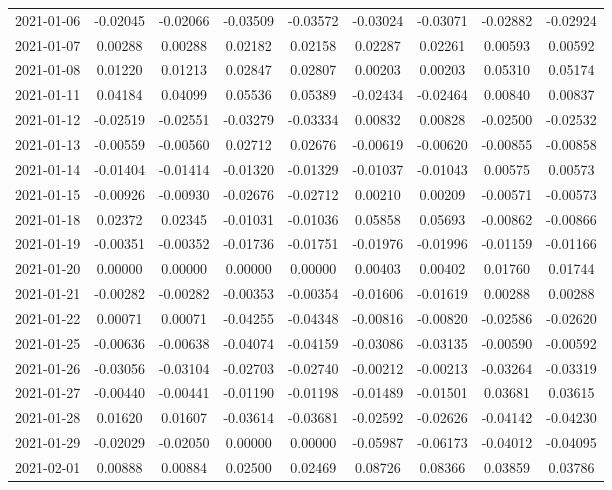 \begin{footnotesize}
\begin{longtable}{lcccccccc}
2021-01-06 & -0.02045 & -0.02066 & -0.03509 & -0.03572 & -0.03024 & -0.03071 & -0.02882 & -0.02924 \\
2021-01-07 & 0.00288 & 0.00288 & 0.02182 & 0.02158 & 0.02287 & 0.02261 & 0.00593 & 0.00592 \\
2021-01-08 & 0.01220 & 0.01213 & 0.02847 & 0.02807 & 0.00203 & 0.00203 & 0.05310 & 0.05174 \\
2021-01-11 & 0.04184 & 0.04099 & 0.05536 & 0.05389 & -0.02434 & -0.02464 & 0.00840 & 0.00837 \\
2021-01-12 & -0.02519 & -0.02551 & -0.03279 & -0.03334 & 0.00832 & 0.00828 & -0.02500 & -0.02532 \\
2021-01-13 & -0.00559 & -0.00560 & 0.02712 & 0.02676 & -0.00619 & -0.00620 & -0.00855 & -0.00858 \\
2021-01-14 & -0.01404 & -0.01414 & -0.01320 & -0.01329 & -0.01037 & -0.01043 & 0.00575 & 0.00573 \\
2021-01-15 & -0.00926 & -0.00930 & -0.02676 & -0.02712 & 0.00210 & 0.00209 & -0.00571 & -0.00573 \\
2021-01-18 & 0.02372 & 0.02345 & -0.01031 & -0.01036 & 0.05858 & 0.05693 & -0.00862 & -0.00866 \\
2021-01-19 & -0.00351 & -0.00352 & -0.01736 & -0.01751 & -0.01976 & -0.01996 & -0.01159 & -0.01166 \\
2021-01-20 & 0.00000 & 0.00000 & 0.00000 & 0.00000 & 0.00403 & 0.00402 & 0.01760 & 0.01744 \\
2021-01-21 & -0.00282 & -0.00282 & -0.00353 & -0.00354 & -0.01606 & -0.01619 & 0.00288 & 0.00288 \\
2021-01-22 & 0.00071 & 0.00071 & -0.04255 & -0.04348 & -0.00816 & -0.00820 & -0.02586 & -0.02620 \\
2021-01-25 & -0.00636 & -0.00638 & -0.04074 & -0.04159 & -0.03086 & -0.03135 & -0.00590 & -0.00592 \\
2021-01-26 & -0.03056 & -0.03104 & -0.02703 & -0.02740 & -0.00212 & -0.00213 & -0.03264 & -0.03319 \\
2021-01-27 & -0.00440 & -0.00441 & -0.01190 & -0.01198 & -0.01489 & -0.01501 & 0.03681 & 0.03615 \\
2021-01-28 & 0.01620 & 0.01607 & -0.03614 & -0.03681 & -0.02592 & -0.02626 & -0.04142 & -0.04230 \\
2021-01-29 & -0.02029 & -0.02050 & 0.00000 & 0.00000 & -0.05987 & -0.06173 & -0.04012 & -0.04095 \\
2021-02-01 & 0.00888 & 0.00884 & 0.02500 & 0.02469 & 0.08726 & 0.08366 & 0.03859 & 0.03786 \\

\end{longtable}
\end{footnotesize}

